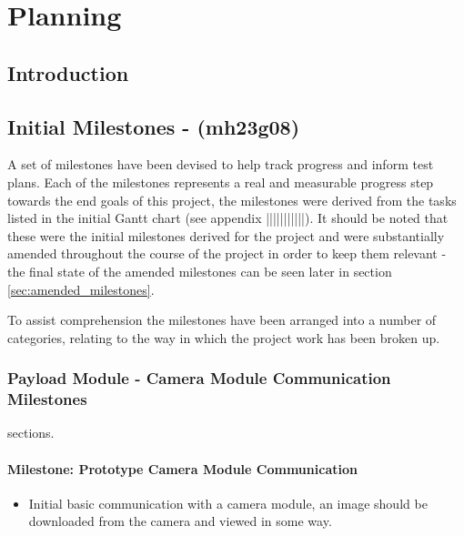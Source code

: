 \chapter{Planning}

\section{Introduction}

\section{Initial Milestones - (mh23g08)}
\label{sec:initial_milestones}
A set of milestones have been devised to help track progress and inform test plans.
Each of the milestones represents a real and measurable progress step towards the 
end goals of this project, the milestones were derived from the tasks listed in the initial
Gantt chart (see appendix |||||||||||). It should be noted that these were the initial
milestones derived for the project and were substantially amended throughout the course of
the project in order to keep them relevant - the final state of the amended milestones
can be seen later in section \ref{sec:amended_milestones}.

To assist comprehension the milestones have been arranged into a number of categories,
relating to the way in which the project work has been broken up.

\subsection{Payload Module - Camera Module Communication Milestones}
sections. 
	\subsubsection{Milestone: Prototype Camera Module Communication}
	\label{sec:ms_init_prototype_camera_module_comms}
		\begin{itemize}
			\item 	Initial basic communication with a camera module, an image should be
				downloaded from the camera and viewed in some way.
		\end{itemize}

